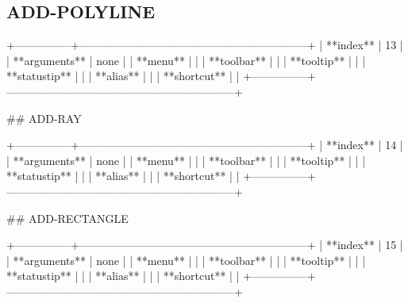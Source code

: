 \subsection{ADD-POLYLINE}

+---------------+--------------------------------------------------------------+
| **index**     | 13                                                           |
| **arguments** | none                                                         |
| **menu**      |                                                              |
| **toolbar**   |                                                              |
| **tooltip**   |                                                              |
| **statustip** |                                                              |
| **alias**     |                                                              |
| **shortcut**  |                                                              |
+---------------+--------------------------------------------------------------+


## ADD-RAY

+---------------+--------------------------------------------------------------+
| **index**     | 14                                                           |
| **arguments** | none                                                         |
| **menu**      |                                                              |
| **toolbar**   |                                                              |
| **tooltip**   |                                                              |
| **statustip** |                                                              |
| **alias**     |                                                              |
| **shortcut**  |                                                              |
+---------------+--------------------------------------------------------------+


## ADD-RECTANGLE

+---------------+--------------------------------------------------------------+
| **index**     | 15                                                           |
| **arguments** | none                                                         |
| **menu**      |                                                              |
| **toolbar**   |                                                              |
| **tooltip**   |                                                              |
| **statustip** |                                                              |
| **alias**     |                                                              |
| **shortcut**  |                                                              |
+---------------+--------------------------------------------------------------+


